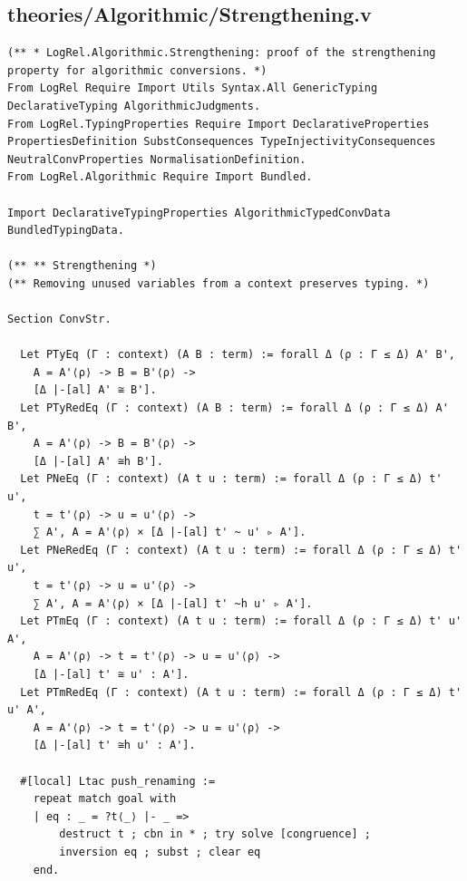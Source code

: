\subsection*{theories/Algorithmic/Strengthening.v}
\begin{lstlisting}
(** * LogRel.Algorithmic.Strengthening: proof of the strengthening property for algorithmic conversions. *)
From LogRel Require Import Utils Syntax.All GenericTyping DeclarativeTyping AlgorithmicJudgments.
From LogRel.TypingProperties Require Import DeclarativeProperties PropertiesDefinition SubstConsequences TypeInjectivityConsequences NeutralConvProperties NormalisationDefinition.
From LogRel.Algorithmic Require Import Bundled.

Import DeclarativeTypingProperties AlgorithmicTypedConvData BundledTypingData.

(** ** Strengthening *)
(** Removing unused variables from a context preserves typing. *)

Section ConvStr.
  
  Let PTyEq (Γ : context) (A B : term) := forall Δ (ρ : Γ ≤ Δ) A' B',
    A = A'⟨ρ⟩ -> B = B'⟨ρ⟩ ->
    [Δ |-[al] A' ≅ B'].
  Let PTyRedEq (Γ : context) (A B : term) := forall Δ (ρ : Γ ≤ Δ) A' B',
    A = A'⟨ρ⟩ -> B = B'⟨ρ⟩ ->
    [Δ |-[al] A' ≅h B'].
  Let PNeEq (Γ : context) (A t u : term) := forall Δ (ρ : Γ ≤ Δ) t' u',
    t = t'⟨ρ⟩ -> u = u'⟨ρ⟩ ->
    ∑ A', A = A'⟨ρ⟩ × [Δ |-[al] t' ~ u' ▹ A'].
  Let PNeRedEq (Γ : context) (A t u : term) := forall Δ (ρ : Γ ≤ Δ) t' u',
    t = t'⟨ρ⟩ -> u = u'⟨ρ⟩ ->
    ∑ A', A = A'⟨ρ⟩ × [Δ |-[al] t' ~h u' ▹ A'].
  Let PTmEq (Γ : context) (A t u : term) := forall Δ (ρ : Γ ≤ Δ) t' u' A',
    A = A'⟨ρ⟩ -> t = t'⟨ρ⟩ -> u = u'⟨ρ⟩ ->
    [Δ |-[al] t' ≅ u' : A'].
  Let PTmRedEq (Γ : context) (A t u : term) := forall Δ (ρ : Γ ≤ Δ) t' u' A',
    A = A'⟨ρ⟩ -> t = t'⟨ρ⟩ -> u = u'⟨ρ⟩ ->
    [Δ |-[al] t' ≅h u' : A'].

  #[local] Ltac push_renaming :=
    repeat match goal with
    | eq : _ = ?t⟨_⟩ |- _ =>
        destruct t ; cbn in * ; try solve [congruence] ;
        inversion eq ; subst ; clear eq
    end.


\end{lstlisting}
